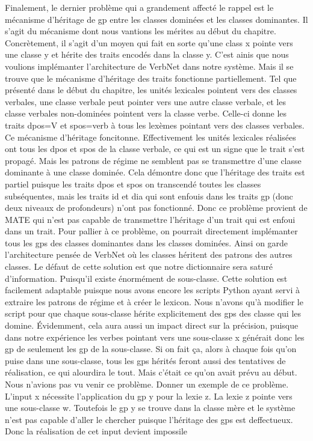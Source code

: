 Finalement, le dernier problème qui a grandement affecté le rappel est le mécanisme d'héritage de gp entre les classes dominées et les classes dominantes. Il s'agit du mécanisme dont nous vantions les mérites au début du chapitre. Concrètement, il s'agit d'un moyen qui fait en sorte qu'une class x pointe vers une classe y et hérite des traits encodés dans la classe y. C'est ainis que nous voulions implémanter l'architecture de VerbNet dans notre système. Mais il se trouve que le mécanisme d'héritage des traits fonctionne partiellement. Tel que présenté dans le début du chapitre, les unités lexicales pointent vers des classes verbales, une classe verbale peut pointer vers une autre classe verbale, et les classe verbales non-dominées pointent vers la classe verbe. Celle-ci donne les traits dpos=V et spos=verb à tous les lexèmes pointant vers des classes verbales. Ce mécanisme d'héritage foncitonne. Effectivement les unités lexicales réalisées ont tous les dpos et spos de la classe verbale, ce qui est un signe que le trait s'est propagé. Mais les patrons de régime ne semblent pas se transmettre d'une classe dominante à une classe dominée. Cela démontre donc que l'héritage des traits est partiel puisque les traits dpos et spos on transcendé toutes les classes subséquentes, mais les traits id et dia qui sont enfouis dans les traits gp (donc deux niveaux de profondeurs) n'ont pas fonctionné. Donc ce problème provient de MATE qui n'est pas capable de transmettre l'héritage d'un trait qui est enfoui dans un trait. Pour pallier à ce problème, on pourrait directement implémanter tous les gps des classes dominantes dans les classes dominées. Ainsi on garde l'architecture pensée de VerbNet où les classes héritent des patrons des autres classes. Le défaut de cette solution est que notre dictionnaire sera saturé d'information. Puisqu'il existe énormément de sous-classe. Cette solution est facilement adaptable puisque nous avons encore les scripts Python ayant servi à extraire les patrons de régime et à créer le lexicon. Nous n'avons qu'à modifier le script pour que chaque sous-classe hérite explicitement des gps des classe qui les domine. Évidemment, cela aura aussi un impact direct sur la précision, puisque dans notre expérience les verbes pointant vers une sous-classe x générait donc les gp de seulement les gp de la sous-classe. Si on fait ça, alors à chaque fois qu'on puise dans une sous-classe, tous les gps hérités feront aussi des tentatives de réalisation, ce qui alourdira le tout. Mais c'était ce qu'on avait prévu au début. Nous n'avions pas vu venir ce problème. Donner un exemple de ce problème. L'input x nécessite l'application du gp y pour la lexie z. La lexie z pointe vers une sous-classe w. Toutefois le gp y se trouve dans la classe mère et le système n'est pas capable d'aller le chercher puisque l'héritage des gps est deffectueux. Donc la réalisation de cet input devient impossile

